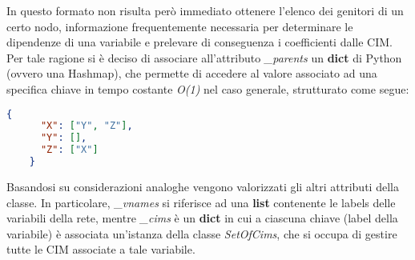   In questo formato non risulta però immediato ottenere l'elenco dei genitori di un certo nodo, informazione
  frequentemente necessaria per determinare le dipendenze di una variabile e prelevare di conseguenza i coefficienti dalle CIM.
  Per tale ragione si è deciso di associare all'attributo \textit{\_parents} un \textbf{dict} di Python (ovvero una Hashmap), che
  permette di accedere al valore associato ad una specifica chiave in tempo costante \textit{O(1)} nel caso generale, strutturato
  come segue:

  \begin{lstlisting}[language=json]
    {
      "X": ["Y", "Z"], 
      "Y": [], 
      "Z": ["X"]
    }
  \end{lstlisting}

  Basandosi su considerazioni analoghe vengono valorizzati gli altri attributi della classe.
  In particolare, \textit{\_vnames} si riferisce ad una \textbf{list} contenente le labels delle variabili della rete, 
  mentre \textit{\_cims} è un \textbf{dict} in cui a ciascuna chiave (label della variabile) è associata un'istanza della classe \textit{SetOfCims}, 
  che si occupa di gestire tutte le CIM associate a tale variabile.

